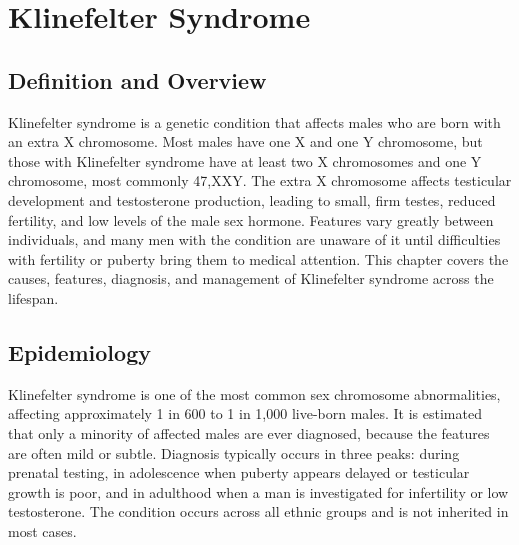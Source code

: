\chapter{Klinefelter Syndrome}

\section*{Definition and Overview}
Klinefelter syndrome is a genetic condition that affects males who are born with an extra X chromosome. Most males have one X and one Y chromosome, but those with Klinefelter syndrome have at least two X chromosomes and one Y chromosome, most commonly 47,XXY. The extra X chromosome affects testicular development and testosterone production, leading to small, firm testes, reduced fertility, and low levels of the male sex hormone. Features vary greatly between individuals, and many men with the condition are unaware of it until difficulties with fertility or puberty bring them to medical attention. This chapter covers the causes, features, diagnosis, and management of Klinefelter syndrome across the lifespan.

\section*{Epidemiology}
Klinefelter syndrome is one of the most common sex chromosome abnormalities, affecting approximately 1 in 600 to 1 in 1,000 live-born males. It is estimated that only a minority of affected males are ever diagnosed, because the features are often mild or subtle. Diagnosis typically occurs in three peaks: during prenatal testing, in adolescence when puberty appears delayed or testicular growth is poor, and in adulthood when a man is investigated for infertility or low testosterone. The condition occurs across all ethnic groups and is not inherited in most cases.

